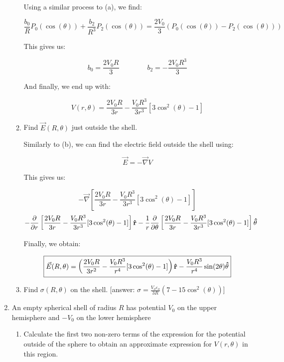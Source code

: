 \begin{enumerate}
\begin{enumerate}
        Using a similar process to (a), we find:

        $$\frac{b_0}{R}P_0(\cos(\theta))+\frac{b_2}{R^3}P_2(\cos(\theta))=\frac{2V_0}{3}\left( P_0(\cos(\theta))-P_2(\cos(\theta)) \right)$$

        This gives us:

        $$b_0=\frac{2V_0R}{3}\quad\quad\quad\quad b_2=-\frac{2V_0R^3}{3}$$

        And finally, we end up with:

        $$\boxed{V(r,\theta)=\frac{2V_0R}{3r}-\frac{V_0R^3}{3r^3}[3\cos^2(\theta)-1]}$$

      \item Find $\vec{E}(R, \theta)$ just outside the shell.

        Similarly to (b), we can find the electric field outside the shell using:

        $$\vec{E}=-\vec{\nabla}V$$

        This gives us:

        $$-\vec{\nabla}\left[ \frac{2V_0R}{3r}-\frac{V_0R^3}{3r^3}[3\cos^2(\theta)-1] \right]$$
        $$-\frac{\partial}{\partial r}\left[ \frac{2V_0R}{3r}-\frac{V_0R^3}{3r^3}[3\cos^2(\theta)-1] \right]\bold{\hat{r}}-\frac{1}{r}\frac{\partial}{\partial \theta}\left[ \frac{2V_0R}{3r}-\frac{V_0R^3}{3r^3}[3\cos^2(\theta)-1] \right]\bold{\hat{\theta}}$$

          Finally, we obtain:

          $$\boxed{\vec{E}(R,\theta)=\left(\frac{2V_0R}{3r^2}-\frac{V_0R^3}{r^4}[3\cos^2(\theta)-1]\right)\bold{\hat{r}}-\frac{V_0R^3}{r^4}\sin(2\theta)\bold{\hat{\theta}}}$$

      \item Find $\sigma(R, \theta)$ on the shell. [answer: $\sigma = \frac{V_o\varepsilon_o}{3R}(7 - 15\cos^2(\theta))$]

    \end{enumerate}

  \item An empty spherical shell of radius $R$ has potential $V_0$ on the upper hemisphere and $−V_0$ on the lower hemisphere

    \begin{enumerate}

      \item Calculate the first two non-zero terms of the expression for the potential outside of the sphere to obtain an approximate expression for $V(r, \theta)$ in this region.


\end{enumerate}
\end{enumerate}
